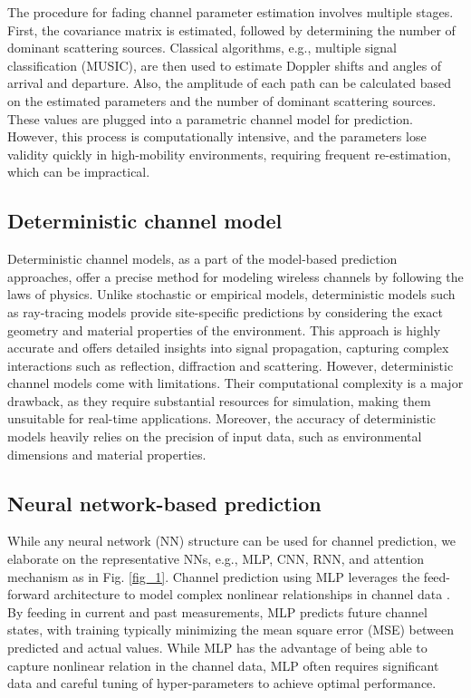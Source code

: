 \documentclass[lettersize,journal]{IEEEtran}
\begin{document}
The procedure for fading channel parameter estimation involves multiple stages. First, the covariance matrix is estimated, followed by determining the number of dominant scattering sources. Classical algorithms, e.g., multiple signal classification (MUSIC), are then used to estimate Doppler shifts and angles of arrival and departure. Also, the amplitude of each path can be calculated based on the estimated parameters and the number of dominant scattering sources. These values are plugged into a parametric channel model for prediction. However, this process is computationally intensive, and the parameters lose validity quickly in high-mobility environments, requiring frequent re-estimation, which can be impractical.

\subsection{Deterministic channel model}
Deterministic channel models, as a part of the model-based prediction approaches, offer a precise method for modeling wireless channels by following the laws of physics. Unlike stochastic or empirical models, deterministic models such as ray-tracing models provide site-specific predictions by considering the exact geometry and material properties of the environment. This approach is highly accurate and offers detailed insights into signal propagation, capturing complex interactions such as reflection, diffraction and scattering. However, deterministic channel models come with limitations. Their computational complexity is a major drawback, as they require substantial resources for simulation, making them unsuitable for real-time applications. Moreover, the accuracy of deterministic models heavily relies on the precision of input data, such as environmental dimensions and material properties.

\subsection{Neural network-based prediction}
While any neural network (NN) structure can be used for channel prediction, we elaborate on the representative NNs, e.g., MLP, CNN, RNN, and attention mechanism as in Fig. \ref{fig_1}. Channel prediction using MLP leverages the feed-forward architecture to model complex nonlinear relationships in channel data \cite{Kim21}. By feeding in current and past measurements, MLP predicts future channel states, with training typically minimizing the mean square error (MSE) between predicted and actual values. While MLP has the advantage of being able to capture nonlinear relation in the channel data, MLP often requires significant data and careful tuning of hyper-parameters to achieve optimal performance.
\end{document}
